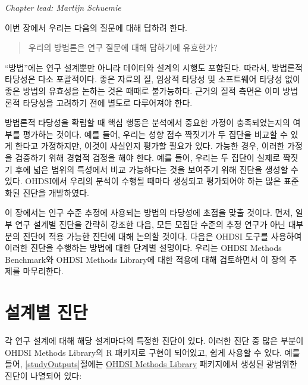 \documentclass[11pt]{book}
\theoremstyle{definition}
\theoremstyle{definition}
\theoremstyle{definition}
\theoremstyle{remark}
\begin{document}

\emph{Chapter lead: Martijn Schuemie}

이번 장에서 우리는 다음의 질문에 대해 답하려 한다.

\begin{quote}
우리의 방법론은 연구 질문에 대해 답하기에 유효한가?
\end{quote}

``방법''에는 연구 설계뿐만 아니라 데이터와 설계의 시행도 포함된다.
따라서, 방법론적 타당성은 다소 포괄적이다. 좋은 자료의 질, 임상적 타당성
및 소프트웨어 타당성 없이 좋은 방법의 유효성을 논하는 것은 때때로
불가능하다. 근거의 질적 측면은 이미 방법론적 타당성을 고려하기 전에
별도로 다루어져야 한다.

방법론적 타당성을 확립할 때 핵심 행동은 분석에서 중요한 가정이
충족되었는지의 여부를 평가하는 것이다. 예를 들어, 우리는 성향 점수
짝짓기가 두 집단을 비교할 수 있게 한다고 가정하지만, 이것이 사실인지
평가할 필요가 있다. 가능한 경우, 이러한 가정을 검증하기 위해 경험적
검정을 해야 한다. 예를 들어, 우리는 두 집단이 실제로 짝짓기 후에 넓은
범위의 특성에서 비교 가능하다는 것을 보여주기 위해 진단을 생성할 수
있다. OHDSI에서 우리의 분석이 수행될 때마다 생성되고 평가되어야 하는
많은 표준화된 진단을 개발하였다.

이 장에서는 인구 수준 추정에 사용되는 방법의 타당성에 초점을 맞출
것이다. 먼저, 일부 연구 설계별 진단을 간략히 강조한 다음, 모든 모집단
수준의 추정 연구가 아닌 대부분의 진단에 적용 가능한 진단에 대해 논의할
것이다. 다음은 OHDSI 도구를 사용하여 이러한 진단을 수행하는 방법에 대한
단계별 설명이다. 우리는 OHDSI Methods Benchmark와 OHDSI Methods
Library에 대한 적용에 대해 검토하면서 이 장의 주제를 마무리한다.

\section{설계별 진단}\label{-}


각 연구 설계에 대해 해당 설계마다의 특정한 진단이 있다. 이러한 진단 중
많은 부분이 OHDSI Methods Library의 R 패키지로 구현이 되어있고, 쉽게
사용할 수 있다. 예를 들어, \ref{studyOutputs}절에는
\href{https://ohdsi.github.io/MethodsLibrary/}{OHDSI Methods Library}
패키지에서 생성된 광범위한 진단이 나열되어 있다:
\end{document}
